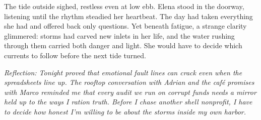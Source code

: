 The tide outside sighed, restless even at low ebb. Elena stood in the doorway, listening until the rhythm steadied her heartbeat. The day had taken everything she had and offered back only questions. Yet beneath fatigue, a strange clarity glimmered: storms had carved new inlets in her life, and the water rushing through them carried both danger and light. She would have to decide which currents to follow before the next tide turned.

\noindent\textit{Reflection: Tonight proved that emotional fault lines can crack even when the spreadsheets line up. The rooftop conversation with Adrian and the café promises with Marco reminded me that every audit we run on corrupt funds needs a mirror held up to the ways I ration truth. Before I chase another shell nonprofit, I have to decide how honest I'm willing to be about the storms inside my own harbor.}
